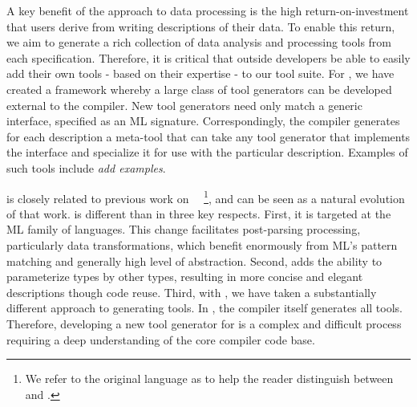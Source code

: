A key benefit of the \pads{} approach to data processing is the
high return-on-investment that users derive from writing 
descriptions of their data. To enable this return, we aim to generate
a rich collection of data analysis and processing tools from each
specification. Therefore, it is critical that outside
developers be able to easily add their own tools - based on their
expertise - to our tool suite.  For \padsml{}, we have created
a framework whereby a large class of tool
generators can be developed external to the compiler.  New tool
generators need only match a generic interface, specified as an ML
signature.  Correspondingly, the compiler generates for each
description a meta-tool that can take any tool generator that
implements the interface and specialize it for use with the particular
description.  Examples of such tools include {\em add examples}.

\padsml{} is closely related to previous work on
\padsc{}~\cite{fisher+:pads}~\footnote{We refer to the original \pads{}
  language as \padsc{} to help the reader distinguish between \padsc{}
  and \padsml{}.}, and can be seen as a natural evolution of that
work.  \padsml{} is different than \padsc{} in three key respects.
First, it is targeted at the ML family of languages. 
This change facilitates post-parsing processing, particularly data
transformations, which benefit enormously from ML's pattern matching
and generally high level of abstraction. 
Second, \padsml{}
adds the ability to parameterize types by other types, resulting in
more concise and elegant descriptions though code reuse. Third, with
\padsml{}, we have taken a substantially different approach to
generating tools. In \padsc{}, the compiler itself generates all
tools.  Therefore,
developing a new tool generator for \padsc{} is a complex and
difficult process requiring a deep understanding of the core compiler
code base.


